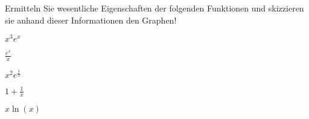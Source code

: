\item Ermitteln Sie wesentliche Eigenschaften der folgenden Funktionen und skizzieren sie anhand dieser Informationen den Graphen!
\begin{enumerate}
\begin{multicols}{3}
\item $x^3 e^x$ 
\item $\frac{e^x}{x}$ 
\item $x^2 e^{\frac{1}{x}}$ 
\item $1+\frac{1}{x}$
\item $x\ln(x)$
\end{multicols}
\end{enumerate}
